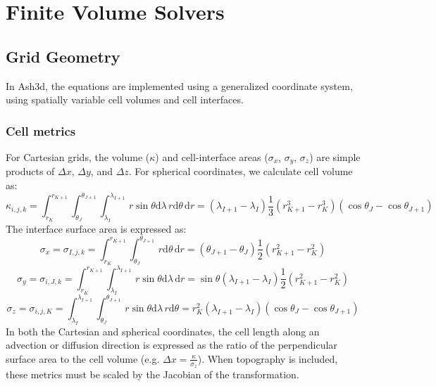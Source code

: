 \chapter{Finite Volume Solvers}\label{ChapAppendFVSolvers}
\section{Grid Geometry}
In Ash3d, the equations are implemented using a generalized coordinate system, using
spatially variable cell volumes and cell interfaces.

\subsection{Cell metrics}
For Cartesian grids, the volume ($\kappa$) and cell-interface areas
($\sigma_x$, $\sigma_y$, $\sigma_z$) are simple products of $\Delta x$,
$\Delta y$, and $\Delta z$. For spherical coordinates, we calculate cell volume as:
\begin{equation}\label{EqCellVolLL}
\kappa_{i,j,k} = \int_{r_K}^{r_{K+1}} \int_{\theta_J}^{\theta_{J+1}} \int_{\lambda_I}^{\lambda_{I+1}}
\, r \sin{\theta} \mathrm{d}\lambda \, r \mathrm{d}\theta \, \mathrm{d}r
= \left( \lambda_{I+1} - \lambda_{I} \right) \frac{1}{3} \left( r_{K+1}^3 - r_{K}^3 \right)
\left( \cos{\theta_{J}} - \cos{\theta_{J+1}}\right)
\end{equation}
The interface surface area is expressed as:
\begin{equation}\label{EqCellSurfILL}
\sigma_x=\sigma_{I,j,k} = \int_{r_K}^{r_{K+1}} \int_{\theta_J}^{\theta_{J+1}}
\, r \mathrm{d}\theta \, \mathrm{d}r
= \left( \theta_{J+1} - \theta_{J} \right) \frac{1}{2} \left( r_{K+1}^2 - r_{K}^2 \right)
\end{equation}
%
\begin{equation}\label{EqCellSurfJLL}
\sigma_y=\sigma_{i,J,k} = \int_{r_K}^{r_{K+1}} \int_{\lambda_I}^{\lambda_{I+1}}
\, r \sin{\theta} \mathrm{d}\lambda \, \mathrm{d}r
= \sin{\theta}\left( \lambda_{I+1} - \lambda_{I} \right) \frac{1}{2} \left( r_{K+1}^2 - r_{K}^2 \right)
\end{equation}
%
\begin{equation}\label{EqCellSurfKLL}
\sigma_z=\sigma_{i,j,K} = \int_{\lambda_I}^{\lambda_{I+1}} \int_{\theta_J}^{\theta_{J+1}}
\, r \sin{\theta} \mathrm{d}\lambda \, r\mathrm{d}\theta
= r_{K}^2 \left( \lambda_{I+1} - \lambda_{I} \right) \left( \cos{\theta_{J}} - \cos{\theta_{J+1}}  \right)
\end{equation}
In both the Cartesian and spherical coordinates, the cell length along an advection
or diffusion direction is expressed as the ratio of the perpendicular
surface area to the cell volume (e.g. $\Delta x = \frac{\kappa}{\sigma_z}$).
When topography is included, these metrics must be scaled by the Jacobian of
the transformation.

